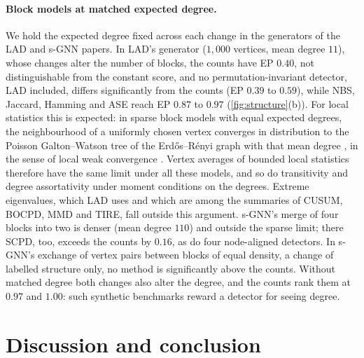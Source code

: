 \documentclass[11pt]{article}
\theoremstyle{dsplain}
\theoremstyle{definition}
\begin{document}
\paragraph{Block models at matched expected degree.} We hold the expected degree
fixed across each change in the generators of the LAD and s-GNN papers. In LAD's generator
($1{,}000$ vertices, mean degree $11$), whose changes alter the number of blocks, the counts have EP
$0.40$, not distinguishable from the constant score, and no permutation-invariant detector, LAD included,
differs significantly from the counts (EP $0.39$ to $0.59$), while NBS, Jaccard, Hamming and ASE reach EP $0.87$ to $0.97$ (\cref{fig:structure}(b)).
For local statistics this is expected: in sparse block models with equal expected degrees, the neighbourhood of a uniformly chosen vertex converges in distribution to the
Poisson Galton--Watson tree of the Erd\H{o}s--R\'enyi graph with that mean degree
\citep{vanderhofstad2024random}, in the sense of local weak convergence
\citep{benjamini2001recurrence,aldous2007processes}. Vertex averages of bounded local statistics therefore
have the same limit under all these models, and so do transitivity and degree assortativity under moment
conditions on the degrees. Extreme eigenvalues, which LAD uses and which are among the summaries of CUSUM, BOCPD, MMD and TIRE, fall outside this argument.
s-GNN's merge of four blocks into two
is denser (mean degree $110$) and outside the sparse limit; there SCPD, too, exceeds the counts by $0.16$,
as do four node-aligned detectors. In s-GNN's exchange of vertex pairs between blocks of equal density, a
change of labelled structure only, no method is significantly above the counts. Without matched degree both changes also alter the degree, and the
counts rank them at $0.97$ and $1.00$: such synthetic benchmarks reward a detector for seeing degree.

\section{Discussion and conclusion}
\label{sec:discussion}
\end{document}
